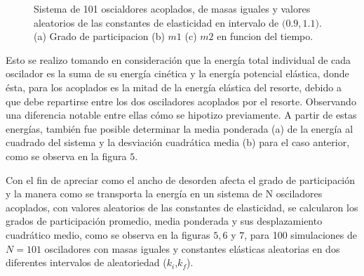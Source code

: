 \documentclass[11pt,letterpaper,twocolumn]{article}
\begin{document}
\begin{figure}[h!]
\begin{center}
\caption{Sistema de 101 oscialdores acoplados, de masas iguales y valores aleatorios de las constantes de elasticidad en intervalo de $(0$.$9,1$.$1)$. (a) Grado de participacion (b) $m1$ (c) $m2$ en funcion del tiempo.}
\end{center}
\end{figure}
\par 
Esto se realizo tomando en consideración que la energía total individual de cada oscilador es la suma de su energía cinética y la energía potencial elástica, donde ésta, para los acoplados es la mitad de la energía elástica del resorte, debido a que debe repartirse entre los dos osciladores acoplados por el resorte. Observando una diferencia notable entre ellas cómo se hipotizo previamente. A partir de estas energías, también fue posible determinar la media ponderada (a) de la energía al cuadrado del sistema y la desviación cuadrática media (b) para el caso anterior, como se observa en la figura $5$.\\
\par 
Con el fin de apreciar como el ancho de desorden afecta el grado de participación y la manera como se transporta la energía en un sistema de N osciladores acoplados, con valores aleatorios de las constantes de elasticidad, se calcularon los grados de participación promedio, media ponderada y sus desplazamiento cuadrático medio, como se observa en la figuras $5,6$ y $7$, para 100 simulaciones de $N=101$ osciladores con masas iguales y constantes elásticas aleatorias en dos diferentes intervalos de aleatoriedad ($k_{i}$,$k_{f}$).\\
\end{document}
